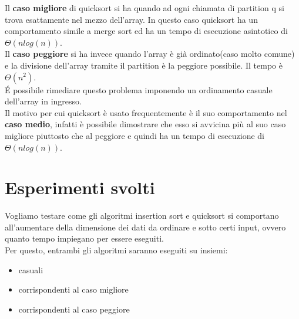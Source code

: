 \documentclass[]{article}
\begin{document}
Il \textbf{caso migliore} di quicksort si ha quando ad ogni chiamata di partition q si trova esattamente nel mezzo dell'array. In questo caso quicksort ha un comportamento simile a merge sort ed ha un tempo di esecuzione asintotico di $\Theta(nlog(n))$.\\
Il \textbf{caso peggiore} si ha invece quando l'array è già ordinato(caso molto comune) e la divisione dell'array tramite il partition è la peggiore possibile. Il tempo è $\Theta(n^2)$.\\
\'E possibile rimediare questo problema imponendo un ordinamento casuale dell'array in ingresso.\\
Il motivo per cui quicksort è usato frequentemente è il suo comportamento nel \textbf{caso medio}, infatti è possibile dimostrare che esso si avvicina più al suo caso migliore piuttosto che al peggiore e quindi ha un tempo di esecuzione di $\Theta(nlog(n))$.\\
\section{Esperimenti svolti}
Vogliamo testare come gli algoritmi insertion sort e quicksort si comportano all'aumentare della dimensione dei dati da ordinare e sotto certi input, ovvero quanto tempo impiegano per essere eseguiti.\\
Per questo, entrambi gli algoritmi saranno eseguiti su insiemi:
\begin{itemize}
\item casuali
\item corrispondenti al caso migliore
\item corrispondenti al caso peggiore
\end{itemize}
\end{document}
